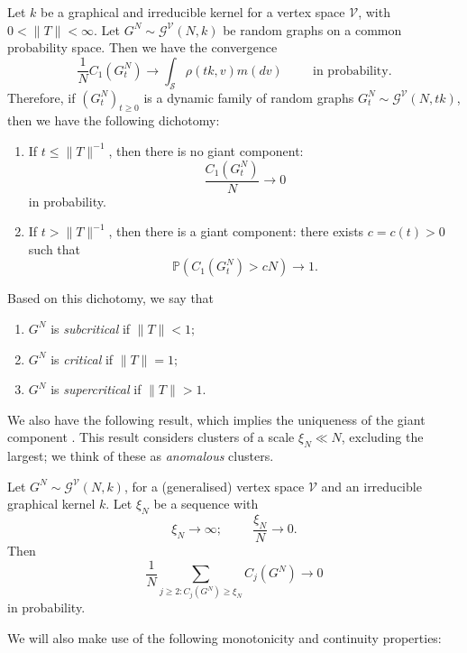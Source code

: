    \begin{theorem}\label{thrm: RG1} Let $k$ be a graphical and irreducible kernel for a vertex space $\mathcal{V}$, with $0<\|T\|< \infty.$ Let $G^N\sim \mathcal{G}^\mathcal{V}(N, k)$ be random graphs on a common probability space. Then we have the convergence \begin{equation}
       \frac{1}{N}C_1(G^N_t)\rightarrow \int_{\mathcal{S}} \rho(tk, v) m(dv) \hspace{1cm} \text{in probability.}
   \end{equation}
   Therefore, if $(G^N_t)_{t\geq 0}$ is a dynamic family of random graphs $
       G^N_t \sim \mathcal{G}^\mathcal{V}(N, tk)$, then we have the following dichotomy:  \begin{enumerate}[label=\roman{*}).]
       \item If $t\leq \|T\|^{-1}$, then there is no giant component: \begin{equation}
           \frac{C_1(G^N_t)}{N} \rightarrow 0
       \end{equation} in probability.
       \item If $t>\|T\|^{-1}$, then there is a giant component: there exists $c=c(t)>0$ such that
       \begin{equation}
           \mathbb{P}(C_1(G^N_t)>cN)\rightarrow 1.
       \end{equation}
   \end{enumerate}\end{theorem}
   \begin{remark} Based on this dichotomy, we say that \begin{enumerate}[label=\roman{*}).]
       \item $G^N$ is \emph{subcritical} if $\|T\|<1;$
       \item $G^N$ is \emph{critical} if $\|T\|=1;$
       \item $G^N$ is \emph{supercritical} if $\|T\|>1.$
   \end{enumerate} \end{remark} We also have the following result, which implies the uniqueness of the giant component \cite[Theorem 3.6]{BJR07}. This result considers clusters of a scale $\xi_N\ll N$, excluding the largest; we think of these as \emph{anomalous} clusters.
   \begin{theorem}\label{thrm: RG2} Let $G^N\sim \mathcal{G}^\mathcal{V}(N, k)$, for a (generalised) vertex space $\mathcal{V}$ and an irreducible graphical kernel $k$. Let $\xi_N$ be a sequence with  \begin{equation}
       \xi_N\rightarrow \infty; \hspace{1cm} \frac{\xi_N}{N}\rightarrow 0.
   \end{equation} Then \begin{equation}
       \frac{1}{N}\sum_{j\geq 2: C_j(G^N)\geq \xi_N}C_j(G^N) \rightarrow 0
   \end{equation} in probability. \end{theorem}   We will also make use of the following monotonicity and continuity properties: \cite[Theorem 6.4]{BJR07}
